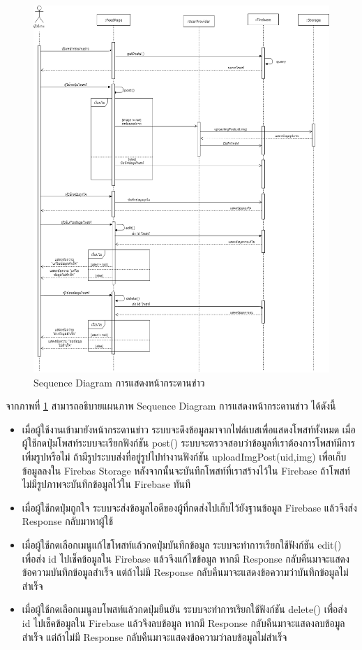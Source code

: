 \begin{figure}[H]
	\centering
	\includegraphics[width=1.\columnwidth]
	{Figures/3/Sequence/feed}
	\caption{Sequence Diagram การแสดงหน้ากระดานข่าว}
	\label{Fig:Sequence-feed}
\end{figure}
\newpage

จากภาพที่ \ref{Fig:Sequence-feed} สามารถอธิบายแผนภาพ Sequence Diagram การแสดงหน้ากระดานข่าว ได้ดังนี้ 
\begin{itemize}
\item เมื่อผู้ใช้งานเข้ามายังหน้ากระดานข่าว ระบบจะดึงข้อมูลมาจากไฟล์เบสเพื่อแสดงโพสท์ทั้งหมด เมื่อผู้ใช้กดปุ่มโพสท์ระบบจะเรียกฟังก์ชัน post() 
ระบบจะตรวจสอบว่าข้อมูลที่เราต้องการโพสท์มีการเพิ่มรูปหรือไม่ ถ้ามีรูประบบส่งที่อยู่รูปไปทำงานฟังก์ชัน uploadImgPost(uid,img) 
เพื่อเก็บข้อมูลลงใน Firebas Storage หลังจากนั้นจะบันทึกโพสท์ที่เราสร้างไว้ใน Firebase ถ้าโพสท์ไม่มีรูปภาพจะบันทึกข้อมูลไว้ใน Firebase ทันที 
\item เมื่อผู้ใช้กดปุ่มถูกใจ ระบบจะส่งข้อมูลไอดีของผู้ที่กดส่งไปเก็บไว้ยังฐานข้อมูล Firebase แล้วจึงส่ง Response กลับมาหาผู้ใช้
\item เมื่อผู้ใช้กดเลือกเมนูแก้ไขโพสท์แล้วกดปุ่มบันทึกข้อมูล ระบบจะทำการเรียกใช้ฟังก์ชัน edit() เพื่อส่ง id ไปเช็คข้อมูลใน Firebase แล้วจึงแก้ไขข้อมูล หากมี Response กลับคืนมาจะแสดงข้อความบันทึกข้อมูลสำเร็จ แต่ถ้าไม่มี Response กลับคืนมาจะแสดงข้อความว่าบันทึกข้อมูลไม่สำเร็จ
\item เมื่อผู้ใช้กดเลือกเมนูลบโพสท์แล้วกดปุ่มยืนยัน ระบบจะทำการเรียกใช้ฟังก์ชัน delete() เพื่อส่ง id ไปเช็คข้อมูลใน Firebase แล้วจึงลบข้อมูล หากมี Response กลับคืนมาจะแสดงลบข้อมูลสำเร็จ แต่ถ้าไม่มี Response กลับคืนมาจะแสดงข้อความว่าลบข้อมูลไม่สำเร็จ
\end{itemize}

